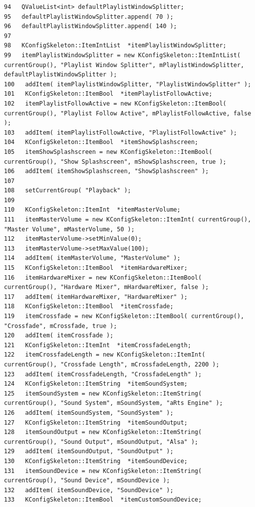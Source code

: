 \begin{verbatim}
94   QValueList<int> defaultPlaylistWindowSplitter;
95   defaultPlaylistWindowSplitter.append( 70 );
96   defaultPlaylistWindowSplitter.append( 140 );
97 
98   KConfigSkeleton::ItemIntList  *itemPlaylistWindowSplitter;
99   itemPlaylistWindowSplitter = new KConfigSkeleton::ItemIntList( currentGroup(), "Playlist Window Splitter", mPlaylistWindowSplitter, defaultPlaylistWindowSplitter );
100   addItem( itemPlaylistWindowSplitter, "PlaylistWindowSplitter" );
101   KConfigSkeleton::ItemBool  *itemPlaylistFollowActive;
102   itemPlaylistFollowActive = new KConfigSkeleton::ItemBool( currentGroup(), "Playlist Follow Active", mPlaylistFollowActive, false );
103   addItem( itemPlaylistFollowActive, "PlaylistFollowActive" );
104   KConfigSkeleton::ItemBool  *itemShowSplashscreen;
105   itemShowSplashscreen = new KConfigSkeleton::ItemBool( currentGroup(), "Show Splashscreen", mShowSplashscreen, true );
106   addItem( itemShowSplashscreen, "ShowSplashscreen" );
107 
108   setCurrentGroup( "Playback" );
109 
110   KConfigSkeleton::ItemInt  *itemMasterVolume;
111   itemMasterVolume = new KConfigSkeleton::ItemInt( currentGroup(), "Master Volume", mMasterVolume, 50 );
112   itemMasterVolume->setMinValue(0);
113   itemMasterVolume->setMaxValue(100);
114   addItem( itemMasterVolume, "MasterVolume" );
115   KConfigSkeleton::ItemBool  *itemHardwareMixer;
116   itemHardwareMixer = new KConfigSkeleton::ItemBool( currentGroup(), "Hardware Mixer", mHardwareMixer, false );
117   addItem( itemHardwareMixer, "HardwareMixer" );
118   KConfigSkeleton::ItemBool  *itemCrossfade;
119   itemCrossfade = new KConfigSkeleton::ItemBool( currentGroup(), "Crossfade", mCrossfade, true );
120   addItem( itemCrossfade );
121   KConfigSkeleton::ItemInt  *itemCrossfadeLength;
122   itemCrossfadeLength = new KConfigSkeleton::ItemInt( currentGroup(), "Crossfade Length", mCrossfadeLength, 2200 );
123   addItem( itemCrossfadeLength, "CrossfadeLength" );
124   KConfigSkeleton::ItemString  *itemSoundSystem;
125   itemSoundSystem = new KConfigSkeleton::ItemString( currentGroup(), "Sound System", mSoundSystem, "aRts Engine" );
126   addItem( itemSoundSystem, "SoundSystem" );
127   KConfigSkeleton::ItemString  *itemSoundOutput;
128   itemSoundOutput = new KConfigSkeleton::ItemString( currentGroup(), "Sound Output", mSoundOutput, "Alsa" );
129   addItem( itemSoundOutput, "SoundOutput" );
130   KConfigSkeleton::ItemString  *itemSoundDevice;
131   itemSoundDevice = new KConfigSkeleton::ItemString( currentGroup(), "Sound Device", mSoundDevice );
132   addItem( itemSoundDevice, "SoundDevice" );
133   KConfigSkeleton::ItemBool  *itemCustomSoundDevice;

\end{verbatim}
